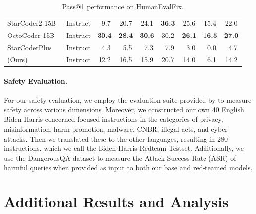 \begin{table}[!ht]
{\begin{tabular}{lc|cccccc|c}
        StarCoder2-15B~\citep{starcoder2} & Instruct & ~9.7 & 20.7 & 24.1 & \textbf{36.3} & 25.6 & 15.4 & 22.0 \\
        OctoCoder-15B~\citep{muennighoff2023octopack} & Instruct & \textbf{30.4} & \textbf{28.4} & \textbf{30.6} & 30.2 & \textbf{26.1} & \textbf{16.5} & \textbf{27.0} \\
        StarCoderPlus~\citep{li2023starcoder} & Instruct & ~4.3 & ~5.5 & ~7.3 & ~7.9 & ~3.0 & ~0.0 & ~4.7 \\
        \rowcolor{verylightgray}{\system} (Ours) & Instruct & 12.2 & 16.5 & 15.9 & 20.7 & 14.0 & ~6.1 & 14.2 \\
        \bottomrule
    \end{tabular}}
    \caption{Pass@1 performance on HumanEvalFix.}\label{tab:hefix}
\end{table}

\paragraph{Safety Evaluation.}
For our safety evaluation, we employ the evaluation suite provided by \cite{bianchi2024safetytuned} to measure safety across various dimensions. Moreover, we constructed our own 40 English Biden-Harris concerned focused instructions in the categories of privacy, misinformation, harm promotion, malware, CNBR, illegal acts, and cyber attacks. Then we translated these to the other languages, resulting in 280 instructions, which we call the Biden-Harris Redteam Testset. Additionally, we use the DangerousQA dataset \citep{bhardwaj2023redteaming} to measure the Attack Success Rate (ASR) of harmful queries when provided as input to both our base and red-teamed models. 

\section{Additional Results and Analysis}\label{analysis_extra}

